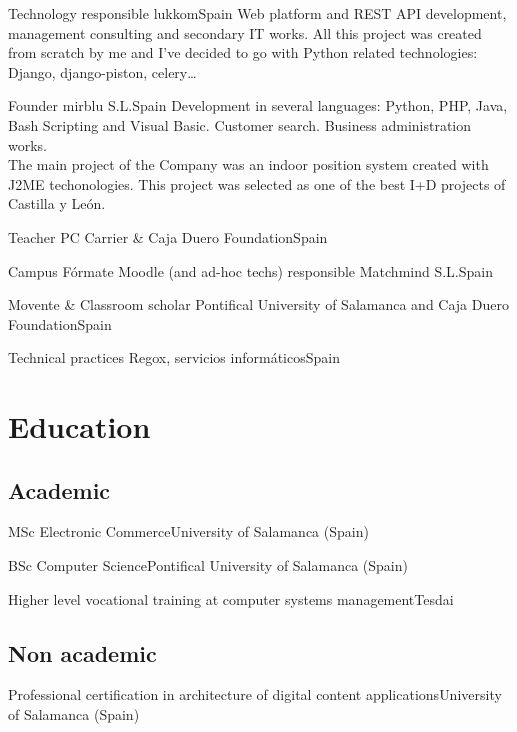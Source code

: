\documentclass[11pt, a4paper, sans]{moderncv}
\begin{document}
{Technology responsible}
{lukkom}{Spain}{}
{Web platform and REST API development, management consulting and secondary IT
works. All this project was created from scratch by me and I've decided to go
with Python related technologies: Django, django-piston, celery\ldots\\}

{Founder}
{mirblu S.L.}{Spain}{}
{Development in several languages: Python, PHP, Java, Bash Scripting and Visual
Basic. Customer search. Business administration works.\\The main project of the
Company was an indoor position system created with J2ME techonologies. This
project was selected as one of the best I+D projects of Castilla y León.\\}

{Teacher}
{PC Carrier \& Caja Duero Foundation}{Spain}{}{}

{Campus Fórmate Moodle (and ad-hoc techs) responsible}
{Matchmind S.L.}{Spain}{}{}

{Movente \& Classroom scholar}
{Pontifical University of Salamanca and Caja Duero Foundation}{Spain}{}{}

{Technical practices}
{Regox, servicios informáticos}{Spain}{}{}


%
%

\section{Education}
\subsection{Academic}
{MSc Electronic Commerce}{University of Salamanca (Spain)}{}{}{}

{BSc Computer Science}{Pontifical University of Salamanca (Spain)}{}{}{}

{Higher level vocational training at computer systems management}{Tesdai}{}{}{}

\subsection{Non academic}
{Professional certification in architecture of digital content applications}{University of Salamanca (Spain)}{}{}{}
\end{document}
